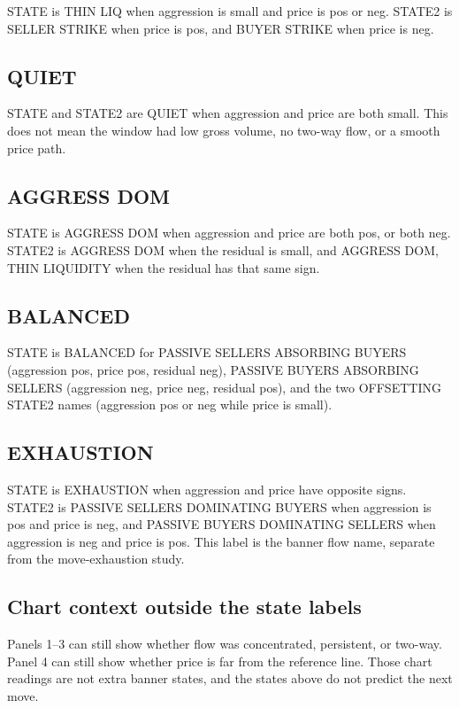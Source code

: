 \documentclass[11pt]{article}
\begin{document}
STATE is THIN LIQ when aggression is small and price is pos or neg. STATE2 is SELLER STRIKE when price is pos, and BUYER STRIKE when price is neg.

\subsection{QUIET}

STATE and STATE2 are QUIET when aggression and price are both small. This does not mean the window had low gross volume, no two-way flow, or a smooth price path.

\subsection{AGGRESS DOM}

STATE is AGGRESS DOM when aggression and price are both pos, or both neg. STATE2 is AGGRESS DOM when the residual is small, and AGGRESS DOM, THIN LIQUIDITY when the residual has that same sign.

\subsection{BALANCED}

STATE is BALANCED for PASSIVE SELLERS ABSORBING BUYERS (aggression pos, price pos, residual neg), PASSIVE BUYERS ABSORBING SELLERS (aggression neg, price neg, residual pos), and the two OFFSETTING STATE2 names (aggression pos or neg while price is small).

\subsection{EXHAUSTION}

STATE is EXHAUSTION when aggression and price have opposite signs. STATE2 is PASSIVE SELLERS DOMINATING BUYERS when aggression is pos and price is neg, and PASSIVE BUYERS DOMINATING SELLERS when aggression is neg and price is pos. This label is the banner flow name, separate from the move-exhaustion study.

\subsection{Chart context outside the state labels}

Panels 1--3 can still show whether flow was concentrated, persistent, or two-way. Panel 4 can still show whether price is far from the reference line. Those chart readings are not extra banner states, and the states above do not predict the next move.
\end{document}
